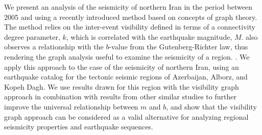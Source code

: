 %
We present an analysis of the seismicity of northern Iran in the period between 2005 and  using a recently introduced method based on concepts of graph theory. The method relies on the inter-event visibility defined in terms of a connectivity degree parameter, $k$, which is correlated with the earthquake magnitude, $M$.  also observes a relationship with the $b$-value from the Gutenberg-Richter law, thus rendering the graph analysis useful to examine the seismicity of a region. . We apply this approach to the case of the seismicity of northern Iran, using an earthquake catalog for the tectonic seismic regions of Azerbaijan, Alborz, and Kopeh Dagh. We use results drawn for this region with the visibility graph approach in combination with results from other similar studies to further improve the universal relationship between $m$ and $b$, and show that the visibility graph approach can be considered as a valid alternative for analyzing regional seismicity properties and earthquake sequences.
